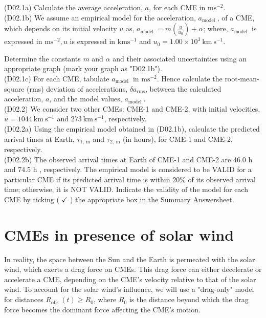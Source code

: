 \documentclass[10pt]{article}
\begin{document}
    (D02.1a) Calculate the average acceleration, $a$, for each CME in $\mathrm{m} \mathrm{s}^{-2}$.\\
    (D02.1b) We assume an empirical model for the acceleration, $a_{\text {model }}$, of a CME, which depends on its initial velocity $u$ as, $a_{\text {model }}=m\left(\frac{u}{u_{0}}\right)+\alpha$; where, $a_{\text {model }}$ is expressed in $\mathrm{m} \mathrm{s}^{-2}, u$ is expressed in $\mathrm{km} \mathrm{s}^{-1}$ and $u_{0}=1.00 \times 10^{3} \mathrm{~km} \mathrm{~s}^{-1}$.
    
    Determine the constants $m$ and $\alpha$ and their associated uncertainties using an appropriate graph (mark your graph as "D02.1b").\\
    (D02.1c) For each CME, tabulate $a_{\text {model }}$ in $\mathrm{m} \mathrm{s}^{-2}$. Hence calculate the root-mean-square (rms) deviation of accelerations, $\delta a_{\mathrm{rms}}$, between the calculated acceleration, $a$, and the model values, $a_{\text {model }}$.\\
    (D02.2) We consider two other CMEs: CME-1 and CME-2, with initial velocities, $u=1044 \mathrm{~km} \mathrm{~s}^{-1}$ and $273 \mathrm{~km} \mathrm{~s}^{-1}$, respectively.\\
    (D02.2a) Using the empirical model obtained in (D02.1b), calculate the predicted arrival times at Earth, $\tau_{1, \mathrm{~m}}$ and $\tau_{2, \mathrm{~m}}$ (in hours), for CME-1 and CME-2, respectively.\\
    (D02.2b) The observed arrival times at Earth of CME-1 and CME-2 are 46.0 h and 74.5 h , respectively. The empirical model is considered to be VALID for a particular CME if its predicted arrival time is within $20 \%$ of its observed arrival time; otherwise, it is NOT VALID. Indicate the validity of the model for each CME by ticking ( $\checkmark$ ) the appropriate box in the Summary Answersheet.
    
    \section*{CMEs in presence of solar wind}
    In reality, the space between the Sun and the Earth is permeated with the solar wind, which exerts a drag force on CMEs. This drag force can either decelerate or accelerate a CME, depending on the CME's velocity relative to that of the solar wind. To account for the solar wind's influence, we will use a "drag-only" model for distances $R_{\text {obs }}(t) \geq R_{0}$, where $R_{0}$ is the distance beyond which the drag force becomes the dominant force affecting the CME's motion.
    
\end{document}
